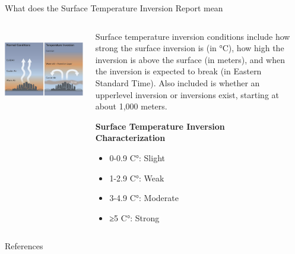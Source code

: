 \documentclass[final]{beamer}
\newlength{\sepwidth}
\newlength{\colwidth}
\newcommand{\separatorcolumn}{\begin{column}{\sepwidth}\end{column}}
\begin{document}
\begin{frame}[t]
\begin{columns}[t]
\begin{column}{\colwidth}
\begin{block}{What does the Surface Temperature Inversion Report mean}
    \begin{columns}[T]
    \begin{column}{0.33\linewidth}
    ~\includegraphics[width=1\textwidth]{citypic.png}
    \end{column}
    \begin{column}{0.6\linewidth}
    
        Surface temperature inversion conditions include how strong the surface inversion is (in °C), how high the inversion is above the surface (in meters), and when the inversion is expected to break (in Eastern Standard Time). Also included is whether an upperlevel inversion or inversions exist, starting at about 1,000 meters.
        
        \textbf{Surface Temperature Inversion Characterization}
            \begin{itemize}
              \item 0-0.9 C°: Slight
              \item 1-2.9 C°: Weak
              \item 3-4.9 C°: Moderate
              \item ≥5 C°: Strong
            \end{itemize}
    \end{column}
    \end{columns}    


  \end{block}



  \begin{block}{References}

    \nocite{*}
    \footnotesize{}

  \end{block}

\end{column}

\separatorcolumn

\end{columns}

\end{frame}
\end{document}
